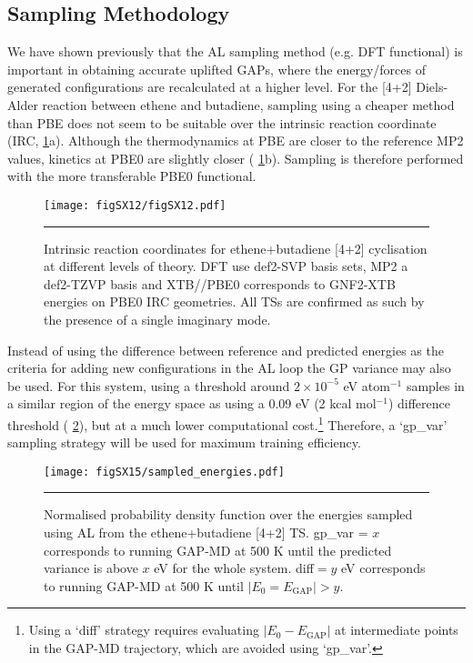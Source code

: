 \documentclass[11pt]{article}
\numberwithin{equation}{subsection}
\newcommand{\kcal}{kcal mol$^{-1}$}
\begin{document}
\subsection{Sampling Methodology}

We have shown previously that the AL sampling method (e.g. DFT functional) is important in obtaining accurate uplifted GAPs,\supercite{gaptrain2021} where the energy/forces of generated configurations are recalculated at a higher level. For the [4+2] Diels-Alder reaction between ethene and butadiene, sampling using a cheaper method than PBE does not seem to be suitable over the intrinsic reaction coordinate (IRC, \figurename{ \ref{fig::SX12}}a). Although the thermodynamics at PBE are closer to the reference MP2 values, kinetics at PBE0 are slightly closer (\figurename{ \ref{fig::SX12}}b). Sampling is therefore performed with the more transferable PBE0 functional.


\begin{figure}[h!]
	\centering
	\vspace{0.4cm}
	\texttt{[image: figSX12/figSX12.pdf]}
	\vspace{0.0cm}
	\hrule
	\vspace{0.1cm}
	\caption{Intrinsic reaction coordinates for ethene+butadiene [4+2] cyclisation at different levels of theory. DFT use def2-SVP basis sets, MP2 a def2-TZVP basis and XTB//PBE0 corresponds to GNF2-XTB energies on PBE0 IRC geometries. All TSs are confirmed as such by the presence of a single imaginary mode.}
	\label{fig::SX12}
\end{figure}


Instead of using the difference between reference and predicted energies as the criteria for adding new configurations in the AL loop the GP variance may also be used.\cite{gaptrain2021} For this system, using a threshold around $2 \times10^{-5}$ eV atom${}^{-1}$ samples in a similar region of the energy space as using a 0.09 eV (2 \kcal) difference threshold (\figurename{ \ref{fig::SX15}}), but at a much lower computational cost.\footnote{Using a `diff' strategy requires evaluating $|E_0 - E_\text{GAP}|$ at intermediate points in the GAP-MD trajectory, which are avoided using `gp\_var'.} Therefore, a `gp\_var' sampling strategy will be used for maximum training efficiency.

\begin{figure}[h!]
	\centering
	\vspace{0.4cm}
	\texttt{[image: figSX15/sampled\_energies.pdf]}
	\vspace{0.1cm}
	\hrule
	\vspace{0.1cm}
	\caption{Normalised probability density function over the energies sampled using AL from the ethene+butadiene [4+2] TS. gp\_var = $x$ corresponds to running GAP-MD at 500 K until the predicted variance is above $x$ eV for the whole system. diff$= y$ eV corresponds to running GAP-MD at 500 K until $|E_0 = E_\text{GAP}| > y$.}
	\label{fig::SX15}
\end{figure}
\end{document}
